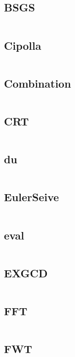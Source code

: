 \documentclass[a4]{article}
\begin{document}
\subsection{BSGS}
\inputminted[mathescape,linenos,numbersep=5pt,frame=lines,framesep=2mm]{cpp}{src/math/BSGS.cpp}
\subsection{Cipolla}
\inputminted[mathescape,linenos,numbersep=5pt,frame=lines,framesep=2mm]{cpp}{src/math/Cipolla.cpp}
\subsection{Combination}
\inputminted[mathescape,linenos,numbersep=5pt,frame=lines,framesep=2mm]{cpp}{src/math/Combination.cpp}
\subsection{CRT}
\inputminted[mathescape,linenos,numbersep=5pt,frame=lines,framesep=2mm]{cpp}{src/math/CRT.cpp}
\subsection{du}
\inputminted[mathescape,linenos,numbersep=5pt,frame=lines,framesep=2mm]{cpp}{src/math/du.cpp}
\subsection{EulerSeive}
\inputminted[mathescape,linenos,numbersep=5pt,frame=lines,framesep=2mm]{cpp}{src/math/EulerSeive.cpp}
\subsection{eval}
\inputminted[mathescape,linenos,numbersep=5pt,frame=lines,framesep=2mm]{cpp}{src/math/eval.cpp}
\subsection{EXGCD}
\inputminted[mathescape,linenos,numbersep=5pt,frame=lines,framesep=2mm]{cpp}{src/math/EXGCD.cpp}
\subsection{FFT}
\inputminted[mathescape,linenos,numbersep=5pt,frame=lines,framesep=2mm]{cpp}{src/math/FFT.cpp}
\subsection{FWT}
\inputminted[mathescape,linenos,numbersep=5pt,frame=lines,framesep=2mm]{cpp}{src/math/FWT.cpp}
\end{document}
